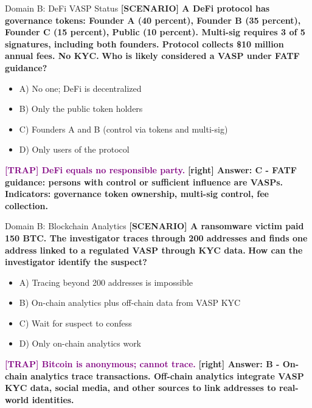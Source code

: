 \documentclass[11pt,a4paper]{beamer}
\newcommand{\trap}[1]{\textcolor{purple}{\textbf{[TRAP] #1}}}
\newcommand{\correct}[1]{\textcolor{green!50!black}{\textbf{[right] #1}}}
\newcommand{\scenario}[1]{\textcolor{blue!70!black}{\textbf{[SCENARIO] #1}}}
\begin{document}
\begin{frame}{Domain B: DeFi VASP Status}
\scenario{A DeFi protocol has governance tokens: Founder A (40 percent), Founder B (35 percent), Founder C (15 percent), Public (10 percent). Multi-sig requires 3 of 5 signatures, including both founders. Protocol collects \$10 million annual fees. No KYC.}
\vspace{0.2cm}
\textbf{Who is likely considered a VASP under FATF guidance?}
\vspace{0.2cm}
\begin{itemize}
    \item A) No one; DeFi is decentralized
    \item B) Only the public token holders
    \item C) Founders A and B (control via tokens and multi-sig)
    \item D) Only users of the protocol
\end{itemize}
\vspace{0.2cm}
\trap{DeFi equals no responsible party.}
\correct{Answer: C - FATF guidance: persons with control or sufficient influence are VASPs. Indicators: governance token ownership, multi-sig control, fee collection.}
\end{frame}

\begin{frame}{Domain B: Blockchain Analytics}
\scenario{A ransomware victim paid 150 BTC. The investigator traces through 200 addresses and finds one address linked to a regulated VASP through KYC data.}
\vspace{0.2cm}
\textbf{How can the investigator identify the suspect?}
\vspace{0.2cm}
\begin{itemize}
    \item A) Tracing beyond 200 addresses is impossible
    \item B) On-chain analytics plus off-chain data from VASP KYC
    \item C) Wait for suspect to confess
    \item D) Only on-chain analytics work
\end{itemize}
\vspace{0.2cm}
\trap{Bitcoin is anonymous; cannot trace.}
\correct{Answer: B - On-chain analytics trace transactions. Off-chain analytics integrate VASP KYC data, social media, and other sources to link addresses to real-world identities.}
\end{frame}
\end{document}
